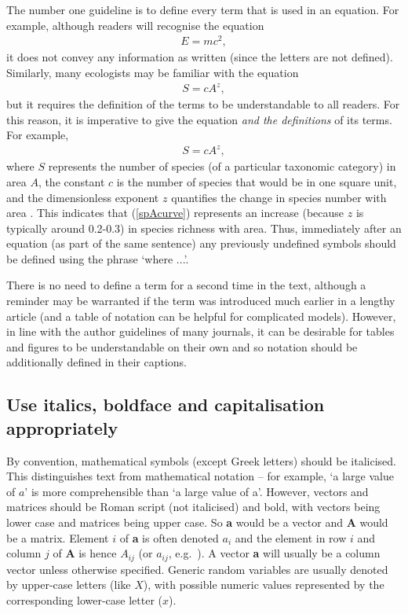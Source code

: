 \documentclass[12pt]{article}
\newcommand{\eb}{\begin{eqnarray}}
\newcommand{\ee}{\end{eqnarray}}
\begin{document}
The number one guideline is to define every term that is used in an equation.
For example, although readers will recognise the equation
\eb
E = mc^2,
\label{Emc2}
\ee
it does not convey any information as written (since the letters are not
defined). Similarly, many ecologists may be familiar with the equation
\eb
S = cA^z,
\ee
but it requires the definition of the terms to be understandable to all readers.
For this reason, it is imperative to give the equation
\emph{and the definitions} of its terms. For example,
\eb
S = cA^z,
\label{spAcurve}
\ee
where $S$ represents the number of species (of a particular taxonomic category)
in area $A$, the constant $c$ is the
number of species that would be in one square unit, and the dimensionless
exponent $z$
quantifies the change in species number with area
\citep{mcs07}.
This indicates that
(\ref{spAcurve}) represents an increase (because $z$ is typically around
0.2-0.3) in species richness with area.
Thus, immediately after an equation (as part of the same sentence)
any previously undefined symbols should be defined using the phrase
`where ...'. 

There is no need to define a term for a second time in the text, although a
reminder may be warranted if the term was introduced much earlier in a lengthy 
article (and a table of notation can be helpful for complicated models).
However, in line with the author guidelines of many journals, it can be
desirable for tables and figures
to be understandable on their own and so notation should be 
additionally defined in their captions.

\subsection*{Use italics, boldface and capitalisation appropriately}

By convention, mathematical symbols (except Greek letters) should be italicised. 
This distinguishes text from 
mathematical notation -- for example, 
`a large value of $a$' is more comprehensible than
`a large value of a'.
 However, vectors and matrices should be Roman script
(not italicised) and bold,
with vectors being lower case and matrices being upper case. So {\bf a} would
be a vector and {\bf A} would be a matrix. Element $i$ of {\bf a} is 
often denoted $a_i$ and the element in row $i$ and column $j$ of {\bf A} is
hence $A_{ij}$ (or $a_{ij}$, e.g.~\citealt{krey93, casw01}). 
A vector {\bf a} will usually be a column vector unless otherwise specified.
Generic random variables are usually denoted by upper-case letters (like $X$),
with possible numeric values represented by the corresponding lower-case letter
($x$).
\end{document}
